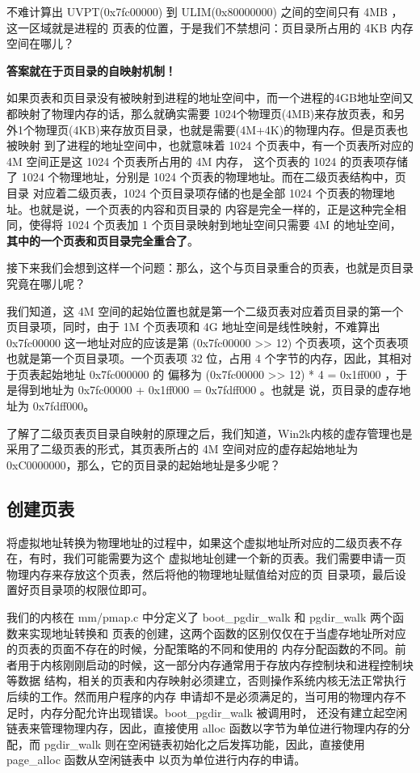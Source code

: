 不难计算出 UVPT(0x7fc00000) 到 ULIM(0x80000000) 之间的空间只有 4MB ，这一区域就是进程的
页表的位置，于是我们不禁想问：页目录所占用的 4KB 内存空间在哪儿？

\textbf{答案就在于页目录的自映射机制！}

如果页表和页目录没有被映射到进程的地址空间中，而一个进程的4GB地址空间又都映射了物理内存的话，那么就确实需要
1024个物理页(4MB)来存放页表，和另外1个物理页(4KB)来存放页目录，也就是需要(4M+4K)的物理内存。但是页表也被映射
到了进程的地址空间中，也就意味着 1024 个页表中，有一个页表所对应的 4M 空间正是这 1024 个页表所占用的 4M 内存，
这个页表的 1024 的页表项存储了 1024 个物理地址，分别是 1024 个页表的物理地址。而在二级页表结构中，页目录
对应着二级页表，1024 个页目录项存储的也是全部 1024 个页表的物理地址。也就是说，一个页表的内容和页目录的
内容是完全一样的，正是这种完全相同，使得将 1024 个页表加 1 个页目录映射到地址空间只需要 4M 的地址空间，
\textbf{其中的一个页表和页目录完全重合了}。

接下来我们会想到这样一个问题：那么，这个与页目录重合的页表，也就是页目录究竟在哪儿呢？

我们知道，这 4M 空间的起始位置也就是第一个二级页表对应着页目录的第一个页目录项，同时，由于 1M 个页表项和 4G
地址空间是线性映射，不难算出 0x7fc00000 这一地址对应的应该是第 (0x7fc00000 >> 12) 个页表项，这个页表项
也就是第一个页目录项。一个页表项 32 位，占用 4 个字节的内存，因此，其相对于页表起始地址 0x7fc000000 的
偏移为 (0x7fc00000 >> 12) * 4 = 0x1ff000 ，于是得到地址为 0x7fc00000 + 0x1ff000 = 0x7fdff000 。也就是
说，页目录的虚存地址为 0x7fdff000。

\begin{thinking}\label{think-windows_pde_addr}
了解了二级页表页目录自映射的原理之后，我们知道，Win2k内核的虚存管理也是采用了二级页表的形式，其页表所占的 4M
空间对应的虚存起始地址为 0xC0000000，那么，它的页目录的起始地址是多少呢？
\end{thinking}

\subsection{创建页表}

将虚拟地址转换为物理地址的过程中，如果这个虚拟地址所对应的二级页表不存在，有时，我们可能需要为这个
虚拟地址创建一个新的页表。我们需要申请一页物理内存来存放这个页表，然后将他的物理地址赋值给对应的页
目录项，最后设置好页目录项的权限位即可。

我们的内核在 mm/pmap.c 中分定义了 boot\_pgdir\_walk 和 pgdir\_walk 两个函数来实现地址转换和
页表的创建，这两个函数的区别仅仅在于当虚存地址所对应的页表的页面不存在的时候，分配策略的不同和使用的
内存分配函数的不同。前者用于内核刚刚启动的时候，这一部分内存通常用于存放内存控制块和进程控制块等数据
结构，相关的页表和内存映射必须建立，否则操作系统内核无法正常执行后续的工作。然而用户程序的内存
申请却不是必须满足的，当可用的物理内存不足时，内存分配允许出现错误。boot\_pgdir\_walk 被调用时，
还没有建立起空闲链表来管理物理内存，因此，直接使用 alloc 函数以字节为单位进行物理内存的分配，而
 pgdir\_walk 则在空闲链表初始化之后发挥功能，因此，直接使用 page\_alloc 函数从空闲链表中
以页为单位进行内存的申请。

